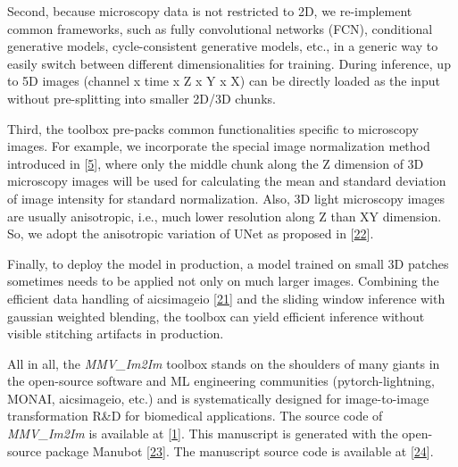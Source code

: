 Second, because microscopy data is not restricted to 2D, we re-implement common frameworks, such as fully convolutional networks (FCN), conditional generative models, cycle-consistent generative models, etc., in a generic way to easily switch between different dimensionalities for training. During inference, up to 5D images (channel x time x Z x Y x X) can be directly loaded as the input without pre-splitting into smaller 2D/3D chunks.

Third, the toolbox pre-packs common functionalities specific to microscopy images. For example, we incorporate the special image normalization method introduced in {[}\protect\hyperlink{ref-Yq8wZ6hc}{5}{]}, where only the middle chunk along the Z dimension of 3D microscopy images will be used for calculating the mean and standard deviation of image intensity for standard normalization. Also, 3D light microscopy images are usually anisotropic, i.e., much lower resolution along Z than XY dimension. So, we adopt the anisotropic variation of UNet as proposed in {[}\protect\hyperlink{ref-jM3v1UjQ}{22}{]}.

Finally, to deploy the model in production, a model trained on small 3D patches sometimes needs to be applied not only on much larger images. Combining the efficient data handling of aicsimageio {[}\protect\hyperlink{ref-gsfWGJKf}{21}{]} and the sliding window inference with gaussian weighted blending, the toolbox can yield efficient inference without visible stitching artifacts in production.

All in all, the \emph{MMV\_Im2Im} toolbox stands on the shoulders of many giants in the open-source software and ML engineering communities (pytorch-lightning, MONAI, aicsimageio, etc.) and is systematically designed for image-to-image transformation R\&D for biomedical applications. The source code of \emph{MMV\_Im2Im} is available at {[}\protect\hyperlink{ref-10dtMviwb}{1}{]}. This manuscript is generated with the open-source package Manubot {[}\protect\hyperlink{ref-YuJbg3zO}{23}{]}. The manuscript source code is available at {[}\protect\hyperlink{ref-B5mAMFLK}{24}{]}.

